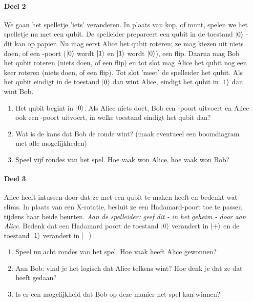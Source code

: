 \documentclass[../main.tex]{subfiles}
\begin{document}
\paragraph*{Deel 2}
We gaan het spelletje 'iets' veranderen. In plaats van kop, of munt, spelen we het spelletje nu met een qubit. De spelleider prepareert een qubit in de toestand $\ket{0}$ - dit kan op papier. Nu mag eerst Alice het qubit roteren; ze mag kiezen uit niets doen, of een -poort ($\ket{0}$ wordt $\ket{1}$ en $\ket{1}$ wordt $\ket{0}$), een flip. Daarna mag Bob het qubit roteren (niets doen, of een flip) en tot slot mag Alice het qubit nog een keer roteren (niets doen, of een flip). Tot slot 'meet' de spelleider het qubit. Als het qubit eindigt in de toestand $\ket{0}$ dan wint Alice, eindigt het qubit in $\ket{1}$ dan wint Bob.

\begin{enumerate}
\item Het qubit begint in $\ket{0}$. Als Alice niets doet, Bob een -poort uitvoert en Alice ook een -poort uitvoert, in welke toestand eindigt het qubit dan?
\item Wat is de kans dat Bob de ronde wint? (maak eventueel een boomdiagram met alle mogelijkheden)
\item Speel vijf rondes van het spel. Hoe vaak won Alice, hoe vaak won Bob?
\end{enumerate}

\paragraph*{Deel 3}
Alice heeft intussen door dat ze met een qubit te maken heeft en bedenkt wat slims. In plaats van een X-rotatie, besluit ze een Hadamard-poort toe te passen tijdens haar beide beurten. \textit{Aan de spelleider: geef dit - in het geheim - door aan Alice}. 
Bedenk dat een Hadamard poort de toestand $\ket{0}$ verandert in $\ket{+}$ en de toestand $\ket{1}$ verandert in $\ket{-}$.
\begin{enumerate}
\item Speel nu acht rondes van het spel. Hoe vaak heeft Alice gewonnen?
\item Aan Bob: vind je het logisch dat Alice telkens wint? Hoe denk je dat ze dat heeft gedaan?
\item Is er een mogelijkheid dat Bob op deze manier het spel kan winnen?
\end{enumerate}
\end{document}
